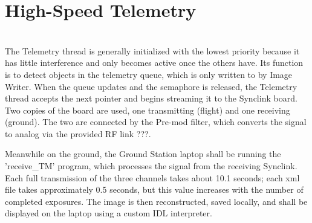 \section{High-Speed Telemetry}
\hrulefill
\\
The Telemetry thread is generally initialized with the lowest priority because it has little interference and only becomes active once the others have. Its function is to detect objects in the telemetry queue, which is only written to by Image Writer. When the queue updates and the semaphore is released, the Telemetry thread accepts the next pointer and begins streaming it to the Synclink board. Two copies of the board are used, one transmitting (flight) and one receiving (ground). The two are connected by the Pre-mod filter, which converts the signal to analog via the provided RF link ???.

Meanwhile on the ground, the Ground Station laptop shall be running the 'receive\_TM' program, which processes the signal from the receiving Synclink. Each full transmission of the three channels takes about 10.1 seconds; each xml file takes approximately 0.5 seconds, but this value increases with the number of completed exposures. The image is then reconstructed, saved locally, and shall be displayed on the laptop using a custom IDL interpreter.
